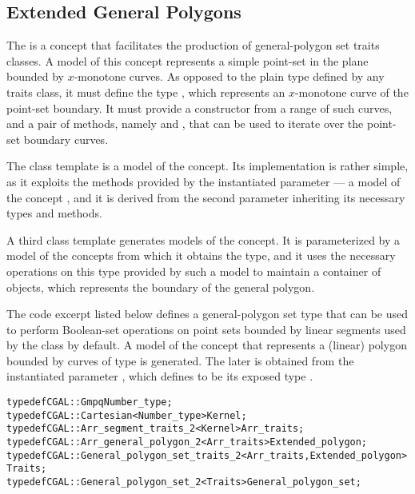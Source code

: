 \subsection{Extended General Polygons}
\label{bobs_ssec:extended_general_polygons}
The  is a concept that facilitates the
production of general-polygon set traits classes. A model of this
concept represents a simple point-set in the plane bounded
by $x$-monotone curves. As opposed to the plain
 type defined by any traits class, it must
define the type , which represents an
$x$-monotone curve of the point-set boundary. It must provide a
constructor from a range of such curves, and a pair of methods, namely
 and , that can be used to
iterate over the point-set boundary curves.
 
The
class template is a model of the 
concept. Its implementation is rather simple, as it exploits the
methods provided by the instantiated parameter
 --- a model of the concept
, and it is derived from the second
parameter  inheriting its necessary types
and methods. 

A third class template
generates models of the  concept. It is
parameterized by a model of the 
concepts from which it obtains the  type, and
it uses the necessary operations on this type provided by such a model
to maintain a container of  objects, which
represents the boundary of the general polygon.

The code excerpt listed below defines a general-polygon set type that
can be used to perform Boolean-set operations on point sets bounded by
linear segments used by the  class by default. A
model of the  concept that represents a
(linear) polygon bounded by curves of type  is
generated. The later is obtained from the instantiated parameter
, which defines  to be
its exposed type .
\begin{alltt}
typedef CGAL::Gmpq                                      Number_type;
typedef CGAL::Cartesian<Number_type>                    Kernel;
typedef CGAL::Arr_segment_traits_2<Kernel>              Arr_traits;
typedef CGAL::Arr_general_polygon_2<Arr_traits>         Extended_polygon;
typedef CGAL::General_polygon_set_traits_2<Arr_traits,Extended_polygon>
                                                        Traits;
typedef CGAL::General_polygon_set_2<Traits>             General_polygon_set;
\end{alltt}


